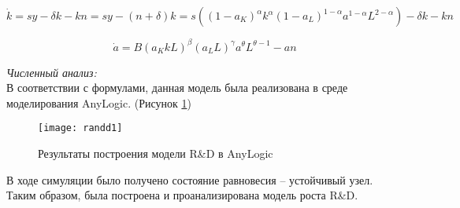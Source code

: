 \[ \dot{k} = sy - \delta k - kn = sy - (n + \delta) k = s ((1 - a_K)^\alpha k^\alpha (1 - a_L)^{1 - \alpha} a^{1 - \alpha} L^{2 - \alpha}) - \delta k - k n \]

\[ \dot{a} = B(a_K k L)^\beta (a_L L)^\gamma a^\theta L^{\theta - 1} - an \]

\textit{Численный анализ:}\\
В соответствии с формулами, данная модель была реализована в среде моделирования AnyLogic. (Рисунок \ref{fig:randd1})
\begin{figure}[h]
	\centering \texttt{[image: randd1]}
	\caption{Результаты построения модели R\&D в AnyLogic}
	\label{fig:randd1}
\end{figure}

В ходе симуляции было получено состояние равновесия -- устойчивый узел.\\

Таким образом, была построена и проанализирована модель роста R\&D.\\
